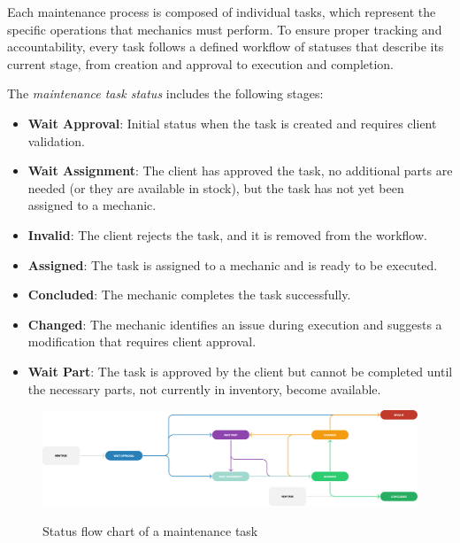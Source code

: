 Each maintenance process is composed of individual tasks, which represent the specific operations that mechanics must perform. To ensure proper tracking and accountability, every task follows a defined workflow of statuses that describe its current stage, from creation and approval to execution and completion.

The \textit{maintenance task status} includes the following stages:
\begin{itemize}
\item \textbf{Wait Approval}: Initial status when the task is created and requires client validation.
\item \textbf{Wait Assignment}: The client has approved the task, no additional parts are needed (or they are available in stock), but the task has not yet been assigned to a mechanic.
\item \textbf{Invalid}: The client rejects the task, and it is removed from the workflow.
\item \textbf{Assigned}: The task is assigned to a mechanic and is ready to be executed.
\item \textbf{Concluded}: The mechanic completes the task successfully.
\item \textbf{Changed}: The mechanic identifies an issue during execution and suggests a modification that requires client approval.
\item \textbf{Wait Part}: The task is approved by the client but cannot be completed until the necessary parts, not currently in inventory, become available.
\end{itemize}


\begin{figure}[h]
  \caption{Status flow chart of a maintenance task}
  \centering
  \includegraphics[width=\textwidth]{figs/Status/MaintenanceTask/StatusDiagram}
  \label{fig:maintenanceTaskFlowChart}
\end{figure}

